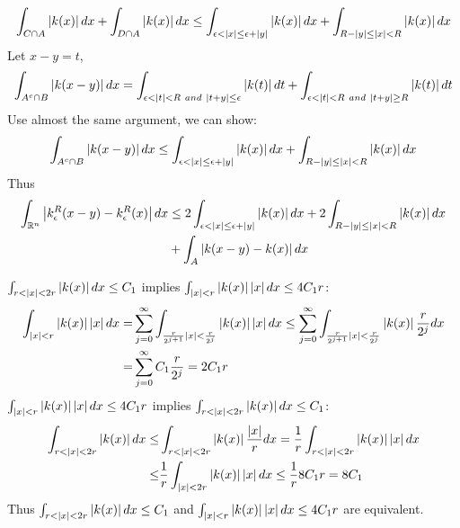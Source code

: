 \begin{remark}
    \begin{equation*}
        \int_{C\cap A}\abs{k(x)}dx+\int_{D\cap A}\abs{k(x)}dx\leq\int_{\epsilon<\abs{x}\leq \epsilon+\abs{y}}\abs{k(x)}dx+\int_{R-\abs{y}\leq\abs{x}< R}\abs{k(x)}dx
    \end{equation*}
    Let $x-y=t$,
    \begin{equation*}
        \int_{A^c\cap B}\abs{k(x-y)}dx=\int_{\epsilon<\abs{t}<R~and~\abs{t+y}\leq\epsilon}\abs{k(t)}d t+\int_{\epsilon<\abs{t}<R~and~\abs{t+y}\geq R}\abs{k(t)}d t
    \end{equation*}
    Use almost the same argument,  we can show:
    \begin{equation*}
        \int_{A^c\cap B}\abs{k(x-y)}dx\leq\int_{\epsilon<\abs{x}\leq \epsilon+\abs{y}}\abs{k(x)}dx+\int_{R-\abs{y}\leq\abs{x}< R}\abs{k(x)}dx
    \end{equation*}
    Thus
    \begin{align*}
        \int_{\mathbb{R}^n}\abs{k_\epsilon^R(x-y)-k_\epsilon^R(x)}dx & \leq 2\int_{\epsilon<\abs{x}\leq \epsilon+\abs{y}}\abs{k(x)}dx+2\int_{R-\abs{y}\leq\abs{x}< R}\abs{k(x)}dx \\
                                                                     & +\int_{A}\abs{k(x-y)-k(x)}dx
    \end{align*}
    \par
    $\int_{r<\abs{x}<2r}\abs{k(x)}dx\leq C_1$ implies $\int_{\abs{x}<r}\abs{k(x)}\abs{x}dx\leq 4C_1r$:
    \begin{align*}
        \int_{\abs{x}<r}\abs{k(x)}\abs{x}dx= & \sum_{j=0}^\infty{\int_{\frac{r}{2^{j+1}}\abs{x}<\frac{r}{2^j}}\abs{k(x)}\abs{x}dx}\leq\sum_{j=0}^\infty{\int_{\frac{r}{2^{j+1}}\abs{x}<\frac{r}{2^j}}\abs{k(x)}\frac{r}{2^j}dx} \\
        =                                    & \sum_{j=0}^\infty{C_1\frac{r}{2^j}}=2C_1r
    \end{align*}
    $\int_{\abs{x}<r}\abs{k(x)}\abs{x}dx\leq 4C_1r$ implies $\int_{r<\abs{x}<2r}\abs{k(x)}dx\leq C_1$:
    \begin{align*}
        \int_{r<\abs{x}<2r}\abs{k(x)}dx\leq & \int_{r<\abs{x}<2r}\abs{k(x)}\frac{\abs{x}}{r}dx=\frac{1}{r}\int_{r<\abs{x}<2r}\abs{k(x)}\abs{x}dx \\
        \leq                                & \frac{1}{r}\int_{\abs{x}<2r}\abs{k(x)}\abs{x}dx\leq\frac{1}{r}8C_1r=8C_1
    \end{align*}
    Thus $\int_{r<\abs{x}<2r}\abs{k(x)}dx\leq C_1$ and $\int_{\abs{x}<r}\abs{k(x)}\abs{x}dx\leq 4C_1r$ are equivalent.
\end{remark}
